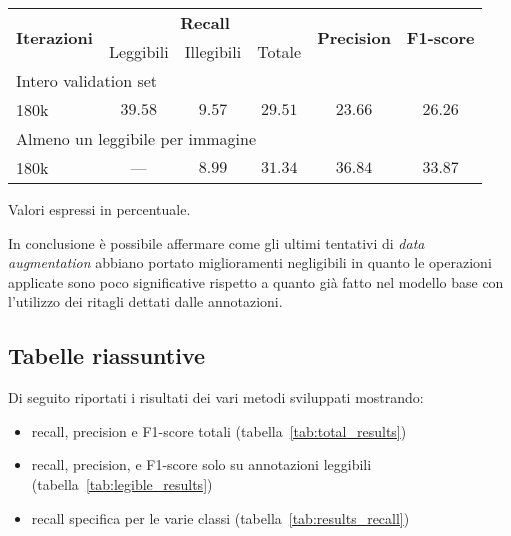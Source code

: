 \begin{table}[H]
\centering
\begin{threeparttable}
	\begin{tabular}{l*{5}c}
		\toprule
		\multirow{2}{*}{\textbf{Iterazioni}} & \multicolumn{3}{c}{\textbf{Recall}} & \multirow{2}{*}{\textbf{Precision}} & \multirow{2}{*}{\textbf{F1-score}} \\
		\cmidrule(lr){2-4}
		& Leggibili & Illegibili & Totale &  &  \\
		\midrule
		\multicolumn{6}{l}{Intero validation set} \\
		180k		& $39.58$ & $9.57$ & $29.51$ & $23.66$ & $26.26$ \\
		\midrule
		\multicolumn{6}{l}{Almeno un leggibile per immagine} \\
		180k		&   ---   & $8.99$ & $31.34$ & $36.84$ & $33.87$ \\
		\bottomrule
	\end{tabular}
	\begin{tablenotes}
		\item \footnotesize{Valori espressi in percentuale.}
	\end{tablenotes}
\end{threeparttable}
\caption{}\label{tab:wdfinal}
\end{table}


In conclusione è possibile affermare come gli ultimi tentativi di \textit{data augmentation} abbiano portato miglioramenti negligibili in quanto le operazioni applicate sono poco significative rispetto a quanto già fatto nel modello base con l'utilizzo dei ritagli dettati dalle annotazioni. 


\subsection{Tabelle riassuntive}
Di seguito riportati i risultati dei vari metodi sviluppati mostrando:
\begin{itemize}
	\item
		recall, precision e F1-score totali (tabella~\ref{tab:total_results})
	\item
		recall, precision, e F1-score solo su annotazioni leggibili (tabella~\ref{tab:legible_results})
	\item
		recall specifica per le varie classi (tabella~\ref{tab:results_recall})
\end{itemize}

\vfill

